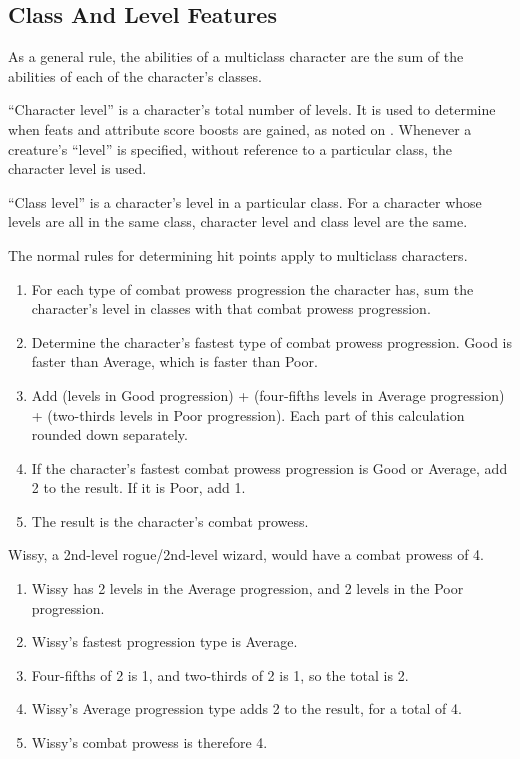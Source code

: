 \subsection{Class And Level Features}
As a general rule, the abilities of a multiclass character are the sum
of the abilities of each of the character's classes.

``Character level'' is a character's total number of levels.
It is used to determine when feats and attribute score boosts are gained, as noted on .
Whenever a creature's ``level'' is specified, without reference to a particular class, the character level is used.

\par ``Class level'' is a character's level in a particular class.
For a character whose levels are all in the same class, character level and class level are the same.

The normal rules for determining hit points apply to multiclass characters.


\begin{enumerate}
    \item For each type of combat prowess progression the character has, sum the character's level in classes with that combat prowess progression.
    \item Determine the character's fastest type of combat prowess progression. Good is faster than Average, which is faster than Poor.
    \item Add (levels in Good progression) + (four-fifths levels in Average progression) + (two-thirds levels in Poor progression). Each part of this calculation rounded down separately.
    \item If the character's fastest combat prowess progression is Good or Average, add 2 to the result. If it is Poor, add 1.
    \item The result is the character's combat prowess.
\end{enumerate}

Wissy, a 2nd-level rogue/2nd-level wizard, would have a combat prowess of 4.
\begin{enumerate}
    \item Wissy has 2 levels in the Average progression, and 2 levels in the Poor progression.
    \item Wissy's fastest progression type is Average.
    \item Four-fifths of 2 is 1, and two-thirds of 2 is 1, so the total is 2.
    \item Wissy's Average progression type adds 2 to the result, for a total of 4.
    \item Wissy's combat prowess is therefore 4.
\end{enumerate}

